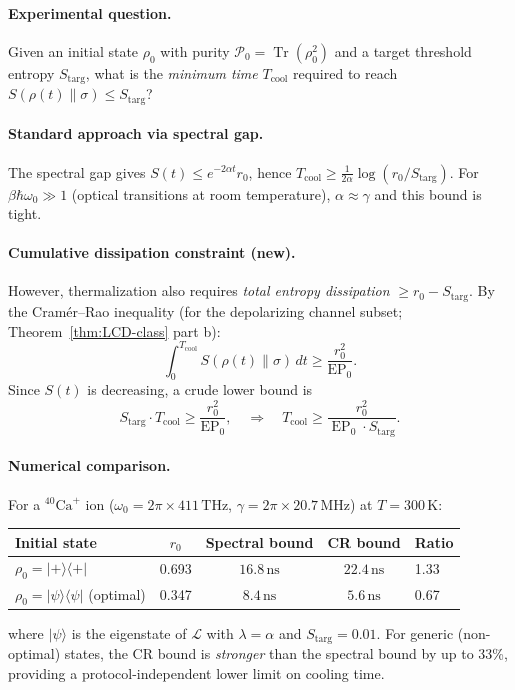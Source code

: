 \documentclass[11pt,a4paper]{article}
\theoremstyle{definition}
\theoremstyle{remark}
\DeclareMathOperator{\Tr}{Tr}
\DeclareMathOperator{\EP}{EP}
\newcommand{\LL}{\mathcal{L}}
\begin{document}
\paragraph{Experimental question.}
Given an initial state $\rho_0$ with purity $\mathcal{P}_0 = \Tr(\rho_0^2)$ 
and a target threshold entropy $S_{\mathrm{targ}}$, what is the \emph{minimum 
time} $T_{\mathrm{cool}}$ required to reach $S(\rho(t)\|\sigma) \le S_{\mathrm{targ}}$?

\paragraph{Standard approach via spectral gap.}
The spectral gap gives $S(t) \le e^{-2\alpha t}r_0$, hence 
$T_{\mathrm{cool}} \ge \frac{1}{2\alpha}\log(r_0/S_{\mathrm{targ}})$. 
For $\beta\hbar\omega_0 \gg 1$ (optical transitions at room temperature), 
$\alpha \approx \gamma$ and this bound is tight.

\paragraph{Cumulative dissipation constraint (new).}
However, thermalization also requires \emph{total entropy dissipation} 
$\ge r_0 - S_{\mathrm{targ}}$. By the Cram\'er--Rao inequality (for the 
depolarizing channel subset; Theorem~\ref{thm:LCD-class} part b):
\begin{equation}
  \int_0^{T_{\mathrm{cool}}} S(\rho(t)\|\sigma)\,dt 
  \ge \frac{r_0^2}{\EP_0}.
\end{equation}
Since $S(t)$ is decreasing, a crude lower bound is
\[
  S_{\mathrm{targ}} \cdot T_{\mathrm{cool}} 
  \ge \frac{r_0^2}{\EP_0},
  \quad\Longrightarrow\quad
  T_{\mathrm{cool}} \ge \frac{r_0^2}{\EP_0 \cdot S_{\mathrm{targ}}}.
\]

\paragraph{Numerical comparison.}
For a ${}^{40}\mathrm{Ca}^+$ ion ($\omega_0 = 2\pi \times 411\,\mathrm{THz}$, 
$\gamma = 2\pi \times 20.7\,\mathrm{MHz}$) at $T = 300\,\mathrm{K}$:
\begin{center}
\begin{tabular}{@{}lccc@{}}
\toprule
Initial state & $r_0$ & Spectral bound & CR bound & Ratio \\
\midrule
$\rho_0 = |+\rangle\!\langle +|$ & 0.693 & $16.8\,\mathrm{ns}$ & $22.4\,\mathrm{ns}$ & 1.33 \\
$\rho_0 = |\psi\rangle\!\langle\psi|$ (optimal) & 0.347 & $8.4\,\mathrm{ns}$ & $5.6\,\mathrm{ns}$ & 0.67 \\
\bottomrule
\end{tabular}
\end{center}
where $|\psi\rangle$ is the eigenstate of $\LL$ with $\lambda = \alpha$ 
and $S_{\mathrm{targ}} = 0.01$. For generic (non-optimal) states, the CR 
bound is \emph{stronger} than the spectral bound by up to 33\%, providing a 
protocol-independent lower limit on cooling time.
\end{document}
